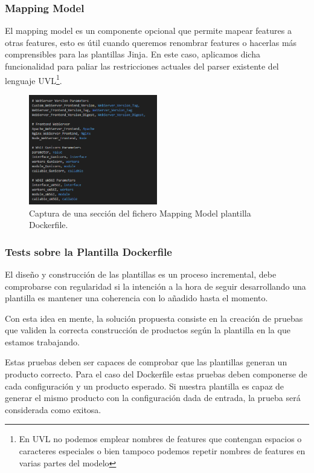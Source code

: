 \documentclass[12pt, a4paper, twoside]{article}
\begin{document}
\subsubsection{Mapping Model}
El mapping model es un componente opcional que permite mapear features a otras features, esto es útil cuando queremos renombrar features o hacerlas más comprensibles para las plantillas Jinja.
En este caso, aplicamos dicha funcionalidad para paliar las restricciones actuales del parser existente del lenguaje UVL\footnote{En UVL no podemos emplear nombres de features que contengan espacios o caracteres especiales o bien tampoco podemos repetir nombres de features en varias partes del modelo}.
\begin{figure}[h]
	\centering
	  \includegraphics[width=0.5\textwidth]{mapping_model_screenshot.png}
	\caption{Captura de una sección del fichero Mapping Model plantilla Dockerfile.}
\end{figure}

\newpage

\subsubsection{Tests sobre la Plantilla Dockerfile}
El diseño y construcción de las plantillas es un proceso incremental, debe comprobarse con regularidad si la intención a la hora de seguir desarrollando una plantilla es mantener una coherencia con lo añadido hasta el momento. 

Con esta idea en mente, la solución propuesta consiste en la creación de pruebas que validen la correcta construcción de productos según la plantilla en la que estamos trabajando.

Estas pruebas deben ser capaces de comprobar que las plantillas generan un producto correcto. Para el caso del Dockerfile estas pruebas deben componerse de cada configuración y un producto esperado. Si nuestra plantilla es capaz de generar el mismo producto con la configuración dada de entrada, la prueba será considerada como exitosa. 
\end{document}
